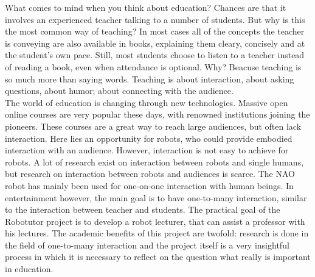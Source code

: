 What comes to mind when you think about education? Chances are that it involves an experienced teacher talking to a number of students. But why is this the most common way of teaching? In most cases all of the concepts the teacher is conveying are also available in books, explaining them cleary, concisely and at the student's own pace. Still, most students choose to listen to a teacher instead of reading a book, even when attendance is optional. Why? Beacuse teaching is so much more than saying words. Teaching is about interaction, about asking questions, about humor; about connecting with the audience.\\

The world of education is changing through new technologies. Massive open online courses are very popular these days, with renowned institutions joining the pioneers. These courses are a great way to reach large audiences, but often lack interaction. Here lies an opportunity for robots, who could provide embodied interaction with an audience. However, interaction is not easy to achieve for robots. A lot of research exist on interaction between robots and single humans, but research on interaction between robots and audiences is scarce. The NAO robot has mainly been used for one-on-one interaction with human beings. In entertainment however, the main goal is to have one-to-many interaction, similar to the interaction between teacher and students. The practical goal of the Robotutor project is to develop a robot lecturer, that can assist a professor with his lectures. The academic benefits of this project are twofold: research is done in the field of one-to-many interaction and the project itself is a very insightful process in which it is necessary to reflect on the question what really is important in education.

